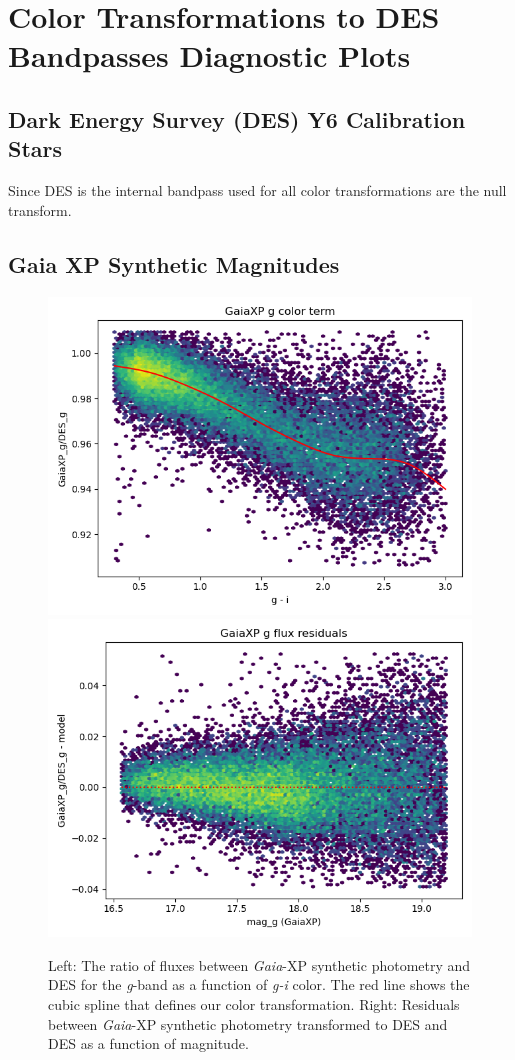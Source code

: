 \section{Color Transformations to DES Bandpasses Diagnostic Plots}
\label{app:colorplots}
\subsection{Dark Energy Survey (DES) Y6 Calibration Stars}
Since DES is the internal bandpass used for \monster all color transformations are the null transform.

\subsection{Gaia XP Synthetic Magnitudes}
\begin{figure}
    \includegraphics[width=0.49\linewidth]{./figures/color_terms/GaiaXP_to_DES_band_g_color_term.png}
    \includegraphics[width=0.49\linewidth]{./figures/color_terms/GaiaXP_to_DES_band_g_flux_residuals.png}
    \caption{Left: The ratio of fluxes between \emph{Gaia}-XP synthetic photometry and DES for the \textit{g}-band as a function of \textit{g-i} color. The red line shows the cubic spline that defines our color transformation.
    Right: Residuals between \emph{Gaia}-XP synthetic photometry transformed to DES and DES as a function of magnitude.}
    \label{fig:acolor-xp-g}
\end{figure}
